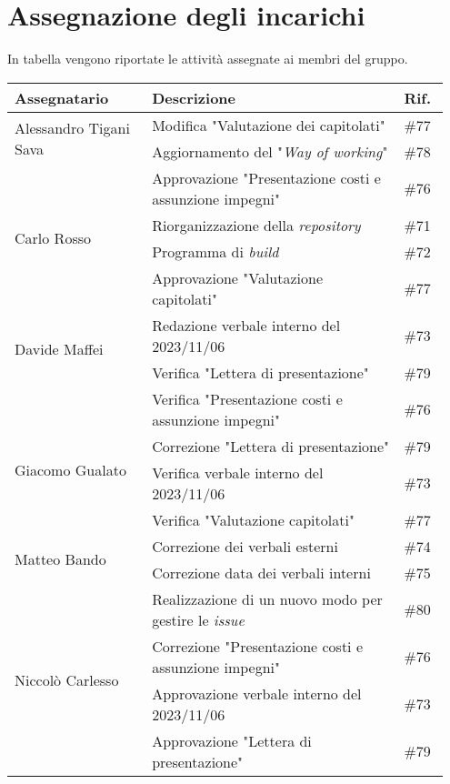 \section{Assegnazione degli incarichi}
In tabella vengono riportate le attività assegnate ai membri del gruppo.
\begin{center}
    {
    \renewcommand{\arraystretch}{1.5}
    \begin{tabular}{p{0.30\linewidth}|p{0.55\linewidth}|p{0.10\linewidth}}
		\textbf{Assegnatario}   		&   \textbf{Descrizione}   & \textbf{Rif.}     \\
		\hline
		\multirow{2}{*}{Alessandro Tigani Sava}  		&	Modifica "Valutazione dei capitolati"		& \#77 	\\
		\cline{2-3}
										&   Aggiornamento del "\textit{Way of working}" 			& \#78  \\  
		\cline{2-3}
										& 	Approvazione "Presentazione costi e assunzione impegni"	& \#76 	\\ 
		\hline
		\multirow{2}{*}{Carlo Rosso}	&	Riorganizzazione della \textit{repository}				& \#71 	\\
		\cline{2-3}
										&	Programma di \textit{build}								& \#72 	\\
		\cline{2-3}
										&	Approvazione "Valutazione capitolati"					& \#77 	\\
		\hline
		\multirow{2}{*}{Davide Maffei}	&   Redazione verbale interno del 2023/11/06				& \#73 	\\
		\cline{2-3}
										& 	Verifica "Lettera di presentazione"						& \#79 	\\ 
		\cline{2-3}
										& 	Verifica "Presentazione costi e assunzione impegni"		& \#76 	\\ 
		\hline
		\multirow{2}{*}{Giacomo Gualato}					
										&	Correzione "Lettera di presentazione" 					& \#79 	\\
        \cline{2-3}
										&   Verifica verbale interno del 2023/11/06				& \#73 \\
		\cline{2-3}
										& 	Verifica "Valutazione capitolati"					& \#77	\\
		\hline
		\multirow{2}{*}{Matteo Bando}	&	Correzione dei verbali esterni 						& \#74 	\\
		\cline{2-3}
										&	Correzione data dei verbali interni					& \#75 	\\
		\cline{2-3}
										&	Realizzazione di un nuovo modo per gestire le \textit{issue} & \#80 	\\
		\hline
		\multirow{2}{*}{Niccolò Carlesso}				
										&	Correzione "Presentazione costi e assunzione impegni"	& \#76 	\\
        \cline{2-3}
										&   Approvazione verbale interno del 2023/11/06				& \#73	\\
		\cline{2-3}
										& 	Approvazione "Lettera di presentazione"					& \#79 	\\ 
    \end{tabular}
    }
\end{center}
